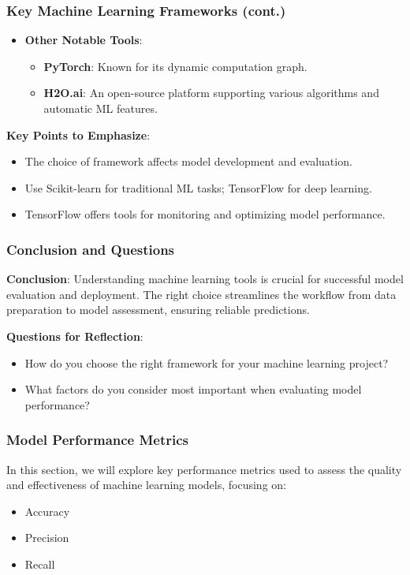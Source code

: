 \documentclass[aspectratio=169]{beamer}
\begin{document}
\begin{frame}
    \frametitle{Key Machine Learning Frameworks (cont.)}
    
    \begin{itemize}
        \item \textbf{Other Notable Tools}:
            \begin{itemize}
                \item \textbf{PyTorch}: Known for its dynamic computation graph.
                \item \textbf{H2O.ai}: An open-source platform supporting various algorithms and automatic ML features.
            \end{itemize}
    \end{itemize}
    
    \textbf{Key Points to Emphasize}:
    \begin{itemize}
        \item The choice of framework affects model development and evaluation.
        \item Use Scikit-learn for traditional ML tasks; TensorFlow for deep learning.
        \item TensorFlow offers tools for monitoring and optimizing model performance.
    \end{itemize}
\end{frame}

\begin{frame}
    \frametitle{Conclusion and Questions}
    
    \textbf{Conclusion}:
    Understanding machine learning tools is crucial for successful model evaluation and deployment. The right choice streamlines the workflow from data preparation to model assessment, ensuring reliable predictions.

    \textbf{Questions for Reflection}:
    \begin{itemize}
        \item How do you choose the right framework for your machine learning project?
        \item What factors do you consider most important when evaluating model performance?
    \end{itemize}
\end{frame}

\begin{frame}[fragile]
    \frametitle{Model Performance Metrics}
    In this section, we will explore key performance metrics used to assess the quality and effectiveness of machine learning models, focusing on:
    \begin{itemize}
        \item Accuracy
        \item Precision
        \item Recall
    \end{itemize}
\end{frame}
\end{document}

